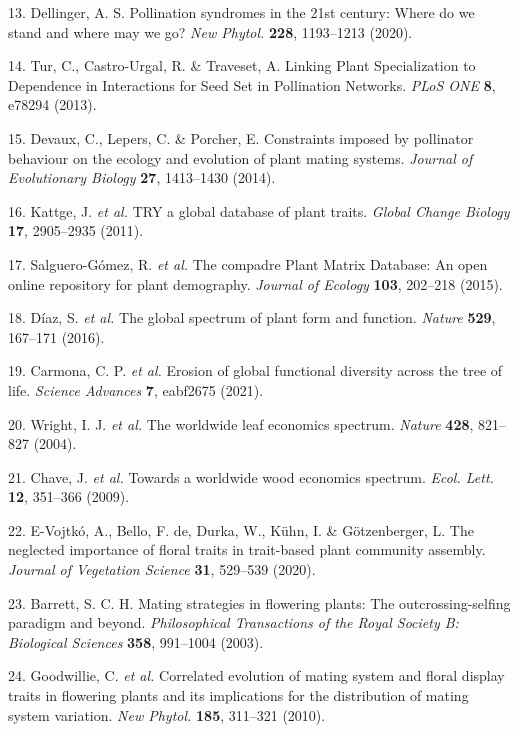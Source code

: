 \documentclass[12pt,a4paper,]{article}
\begin{document}
\hypertarget{ref-dellinger2020}{}
13. Dellinger, A. S. Pollination syndromes in the 21st century: Where do
we stand and where may we go? \emph{New Phytol.} \textbf{228},
1193--1213 (2020).

\hypertarget{ref-tur2013}{}
14. Tur, C., Castro-Urgal, R. \& Traveset, A. Linking Plant
Specialization to Dependence in Interactions for Seed Set in Pollination
Networks. \emph{PLoS ONE} \textbf{8}, e78294 (2013).

\hypertarget{ref-devaux2014}{}
15. Devaux, C., Lepers, C. \& Porcher, E. Constraints imposed by
pollinator behaviour on the ecology and evolution of plant mating
systems. \emph{Journal of Evolutionary Biology} \textbf{27}, 1413--1430
(2014).

\hypertarget{ref-kattge2011}{}
16. Kattge, J. \emph{et al.} TRY a global database of plant traits.
\emph{Global Change Biology} \textbf{17}, 2905--2935 (2011).

\hypertarget{ref-salguero2015}{}
17. Salguero-Gómez, R. \emph{et al.} The compadre Plant Matrix Database:
An open online repository for plant demography. \emph{Journal of
Ecology} \textbf{103}, 202--218 (2015).

\hypertarget{ref-diaz2016}{}
18. Díaz, S. \emph{et al.} The global spectrum of plant form and
function. \emph{Nature} \textbf{529}, 167--171 (2016).

\hypertarget{ref-carmona2021}{}
19. Carmona, C. P. \emph{et al.} Erosion of global functional diversity
across the tree of life. \emph{Science Advances} \textbf{7}, eabf2675
(2021).

\hypertarget{ref-wright2004}{}
20. Wright, I. J. \emph{et al.} The worldwide leaf economics spectrum.
\emph{Nature} \textbf{428}, 821--827 (2004).

\hypertarget{ref-chave2009}{}
21. Chave, J. \emph{et al.} Towards a worldwide wood economics spectrum.
\emph{Ecol. Lett.} \textbf{12}, 351--366 (2009).

\hypertarget{ref-evojtko2020}{}
22. E-Vojtkó, A., Bello, F. de, Durka, W., Kühn, I. \& Götzenberger, L.
The neglected importance of floral traits in trait-based plant community
assembly. \emph{Journal of Vegetation Science} \textbf{31}, 529--539
(2020).

\hypertarget{ref-barrett2003}{}
23. Barrett, S. C. H. Mating strategies in flowering plants: The
outcrossing-selfing paradigm and beyond. \emph{Philosophical
Transactions of the Royal Society B: Biological Sciences} \textbf{358},
991--1004 (2003).

\hypertarget{ref-goodwillie2010}{}
24. Goodwillie, C. \emph{et al.} Correlated evolution of mating system
and floral display traits in flowering plants and its implications for
the distribution of mating system variation. \emph{New Phytol.}
\textbf{185}, 311--321 (2010).
\end{document}
